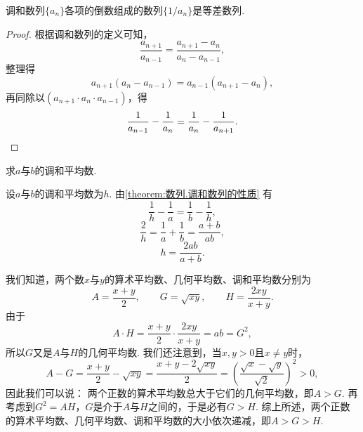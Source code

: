 \begin{property}\label{theorem:数列.调和数列的性质}
调和数列\(\{a_n\}\)各项的倒数组成的数列\(\{1/a_n\}\)是等差数列.
\begin{proof}
根据调和数列的定义可知，\begin{equation*}
    \frac{a_{n+1}}{a_{n-1}}
    = \frac{a_{n+1}-a_n}{a_n-a_{n-1}},
\end{equation*}整理得\begin{equation*}
    a_{n+1} (a_n - a_{n-1})
    = a_{n-1} (a_{n+1} - a_n),
\end{equation*}再同除以\((a_{n+1} \cdot a_n \cdot a_{n-1})\)，得\begin{equation*}
    \frac{1}{a_{n-1}} - \frac{1}{a_n}
    = \frac{1}{a_n} - \frac{1}{a_{n+1}}.
    \qedhere
\end{equation*}
\end{proof}
\end{property}

\begin{example}
求\(a\)与\(b\)的调和平均数.
\begin{solution}
设\(a\)与\(b\)的调和平均数为\(h\).
由\cref{theorem:数列.调和数列的性质} 有\begin{equation*}
    \frac{1}{h} - \frac{1}{a}
    = \frac{1}{b} - \frac{1}{h},
\end{equation*}\begin{equation*}
    \frac{2}{h} = \frac{1}{a} + \frac{1}{b}
    = \frac{a+b}{ab},
\end{equation*}\begin{equation*}
    h = \frac{2ab}{a+b}.
\end{equation*}
\end{solution}
\end{example}

我们知道，两个数\(x\)与\(y\)的算术平均数、几何平均数、调和平均数分别为\begin{equation*}
    A = \frac{x+y}{2}, \qquad
    G = \sqrt{xy}, \qquad
    H = \frac{2xy}{x+y}.
\end{equation*}
由于\begin{equation*}
    A \cdot H = \frac{x+y}{2} \cdot \frac{2xy}{x+y}
    = ab = G^2,
\end{equation*}
所以\(G\)又是\(A\)与\(H\)的几何平均数.
我们还注意到，当\(x,y>0\)且\(x \neq y\)时，\begin{equation*}
    A - G = \frac{x+y}{2} - \sqrt{xy}
    = \frac{x+y-2\sqrt{xy}}{2}
    = \left(\frac{\sqrt{x}-\sqrt{y}}{\sqrt{2}}\right)^2
    > 0,
\end{equation*}
因此我们可以说：
两个正数的算术平均数总大于它们的几何平均数，即\(A > G\).
再考虑到\(G^2 = A H\)，\(G\)是介于\(A\)与\(H\)之间的，于是必有\(G > H\).
综上所述，两个正数的算术平均数、几何平均数、调和平均数的大小依次递减，即\(A > G > H\).

